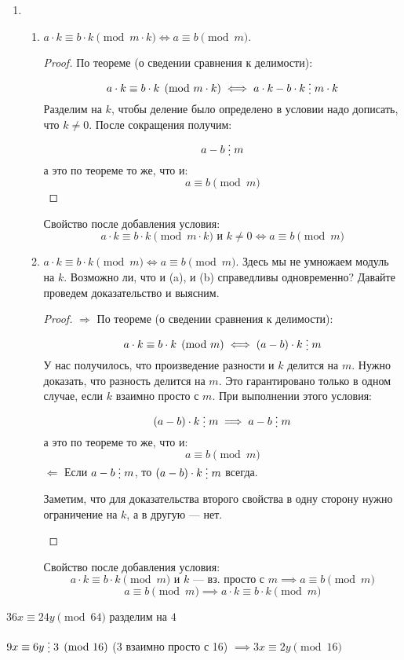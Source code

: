 \documentclass[russian]{lecture-notes}
\newcommand{\divs}{\mathrel{\raisebox{-2pt}{\vdots}}}
\begin{document}
\begin{enumerate}
\begin{proof}
	\end{proof}
	\item 	\begin{enumerate}
				\item $a \cdot k \equiv b \cdot k \pmod{m \cdot k} \iff a \equiv b \pmod m$.
				\label{sravn:2}
				\begin{proof}		
					По теореме (о сведении сравнения к делимости): 
					\[
						a \cdot k \equiv b \cdot k \pmod{m \cdot k} \iff a \cdot k - b \cdot k \divs m \cdot k
					\]
					Разделим на $k$, чтобы деление было определено в условии надо дописать, что $k \ne 0$. После сокращения получим:
					\[
						a - b \divs m
					\]
					а это по теореме то же, что и:
					\[
						a \equiv b \pmod m
					\]
				\end{proof}
				Свойство после добавления условия: 
				\[
					a \cdot k \equiv b \cdot k \pmod{m \cdot k} \text{ и } k \ne 0 \iff a \equiv b \pmod m
				\]
				\item $a \cdot k \equiv b \cdot k \pmod m \iff a \equiv b \pmod m$. Здесь мы не умножаем модуль на $k$. Возможно ли, что и (a), и (b) справедливы одновременно? Давайте проведем доказательство и выясним.
				\label{sravn:3}
				\begin{proof}
					$\Rightarrow$ По теореме (о сведении сравнения к делимости): 
					\[
						a \cdot k \equiv b \cdot k \pmod m \iff (a - b) \cdot k \divs m 
					\]
					У нас получилось, что произведение разности и $k$ делится на $m$. Нужно доказать, что разность делится на $m$. Это гарантировано только в одном случае, если $k$ взаимно просто с $m$. При выполнении этого условия:
					\[
						(a - b) \cdot k \divs m \implies a-b \divs m
					\]
					а это по теореме то же, что и:
					\[
						a \equiv b \pmod m
					\]
					$\Leftarrow$ Если $a-b \divs m$, то $(a - b) \cdot k \divs m$ всегда.
					\begin{remark}
						Заметим, что для доказательства второго свойства в одну сторону нужно ограничение на $k$, а в другую — нет.
					\end{remark}
				\end{proof}
				Свойство после добавления условия:
				\[
					a \cdot k \equiv b \cdot k \pmod m \text{ и } k \text{~--- вз. просто с } m \implies a \equiv b \pmod m
				\]
				\[
					a \equiv b \pmod m \implies a \cdot k \equiv b \cdot k \pmod m
				\]
			\end{enumerate}
\end{enumerate}

\begin{example}
	$36x \equiv 24y \pmod{64}$ разделим на $4$
	
	$9x \equiv 6y\divs 3 \pmod{16}$ (3 взаимно просто с 16) $\implies
	3x \equiv 2y \pmod{16}$
\end{example}
\end{document}
